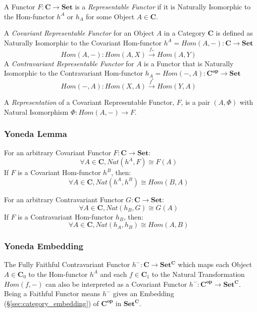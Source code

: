 A Functor $F : \mathbf{C} \rightarrow \mathbf{Set}$ is a
\emph{Representable Functor} if it is Naturally Isomorphic to the
Hom-functor $h^A$ or $h_A$ for some Object $A \in \mathbf{C}$.

A \emph{Covariant Representable Functor} for an Object $A$ in a
Category $\mathbf{C}$ is defined as Naturally Isomorphic to the
Covariant Hom-functor $h^A = Hom(A,-) : \mathbf{C} \rightarrow
\mathbf{Set}$
\[
    Hom(A,-) : Hom(A,X) \xrightarrow{f_*} Hom(A,Y)
\]
A \emph{Contravariant Representable Functor} for $A$ is a Functor that
is Naturally Isomorphic to the Contravariant Hom-functor $h_A =
Hom(-,A) : \mathbf{C^{op}} \rightarrow \mathbf{Set}$
\[
    Hom(-,A) : Hom(X,A) \xrightarrow{f^*} Hom(Y,A)
\]

A \emph{Representation} of a Covariant Representable Functor, $F$, is
a pair $(A, \Phi)$ with Natural Isomorphism $\Phi : Hom(A,-)
\rightarrow F$.



\subsubsection{Yoneda Lemma}\label{sec:yoneda_lemma}

For an arbitrary Covariant Functor $F : \mathbf{C} \rightarrow
\mathbf{Set}$:
\[
    \forall A \in \mathbf{C}, Nat(h^A,F) \cong F(A)
\]
If $F$ is a Covariant Hom-functor $h^B$, then:
\[
    \forall A \in \mathbf{C}, Nat(h^A,h^B) \cong Hom(B,A)
\]

For an arbitrary Contravariant Functor $G : \mathbf{C} \rightarrow
\mathbf{Set}$:
\[
    \forall A \in \mathbf{C}, Nat(h_B,G) \cong G(A)
\]
If $F$ is a Contravariant Hom-functor $h_B$, then:
\[
    \forall A \in \mathbf{C}, Nat(h_A,h_B) \cong Hom(A,B)
\]



\subsubsection{Yoneda Embedding}\label{sec:yoneda_embedding}

The Fully Faithful Contravariant Functor $h^- : \mathbf{C} \rightarrow
\mathbf{Set^C}$ which maps each Object $A \in \mathbf{C}_0$ to the
Hom-functor $h^A$ and each $f \in \mathbf{C}_1$ to the Natural
Transformation $Hom(f,-)$ can also be interpreted as a Covariant
Functor $h^- : \mathbf{C^{op}} \rightarrow \mathbf{Set^C}$. Being a
Faithful Functor means $h^-$ gives an Embedding
(\S\ref{sec:category_embedding}) of $\mathbf{C^{op}}$ in
$\mathbf{Set^C}$.

